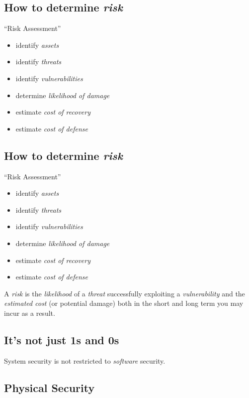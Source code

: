 \documentclass[xga]{xdvislides}
\begin{document}
\subsection{How to determine {\em risk}}
``Risk Assessment''
\begin{itemize}
	\item identify {\em assets}
	\item identify {\em threats}
	\item identify {\em vulnerabilities}
	\item determine {\em likelihood of damage}
	\item estimate {\em cost of recovery}
	\item estimate {\em cost of defense}
\end{itemize}

\subsection{How to determine {\em risk}}
``Risk Assessment''
\begin{itemize}
	\item identify {\em assets}
	\item identify {\em threats}
	\item identify {\em vulnerabilities}
	\item determine {\em likelihood of damage}
	\item estimate {\em cost of recovery}
	\item estimate {\em cost of defense}
\end{itemize}
\vspace{.5in}

A {\em risk} is the {\em likelihood} of a {\em threat} successfully exploiting
a {\em vulnerability} and the {\em estimated cost} (or potential damage) both
in the short and long term you may incur as a result.

\subsection{It's not just 1s and 0s}
\vspace{.5in}
\Huge
\begin{center}
System security is not restricted to {\em software} security.
\end{center}
\Normalsize

\subsection{Physical Security}
\vspace{.5in}
\end{document}
